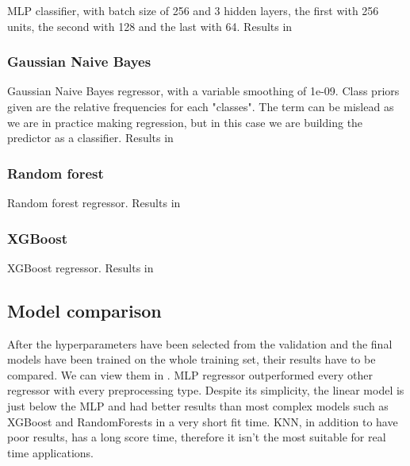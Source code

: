 MLP classifier, with batch size of 256 and 3 hidden layers, the first with 256 units, the second with 128 and the last with 64. Results in 



\subsubsection{Gaussian Naive Bayes}

Gaussian Naive Bayes regressor, with a variable smoothing of 1e-09. Class priors given are the relative frequencies for each "classes". The term can be mislead as we are in practice making regression, but in this case we are building the predictor as a classifier.
Results in 




\subsubsection{Random forest}

Random forest regressor.
Results in 




\subsubsection{XGBoost}

XGBoost regressor.
Results in 



\subsection{Model comparison}

After the hyperparameters have been selected from the validation and the final models have been trained on the whole training set, their results have to be compared. We can view them in .
MLP regressor outperformed every other regressor with every preprocessing type. Despite its simplicity, the linear model is just below the MLP and had better results than most complex models such as XGBoost and RandomForests in a very short fit time. KNN, in addition to have poor results, has a long score time, therefore it isn't the most suitable for real time applications.



